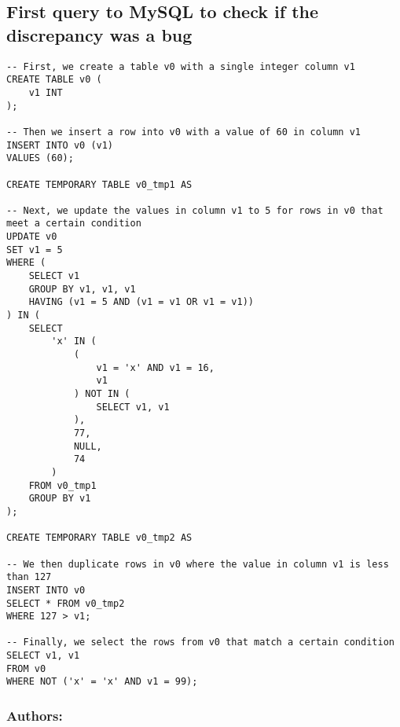 \documentclass[sigconf]{acmart}
\begin{document}
\subsection{First query to MySQL to check if the discrepancy was a bug}
\begin{lstlisting}
-- First, we create a table v0 with a single integer column v1
CREATE TABLE v0 (
    v1 INT
);

-- Then we insert a row into v0 with a value of 60 in column v1
INSERT INTO v0 (v1) 
VALUES (60);

CREATE TEMPORARY TABLE v0_tmp1 AS

-- Next, we update the values in column v1 to 5 for rows in v0 that meet a certain condition
UPDATE v0 
SET v1 = 5 
WHERE (
    SELECT v1 
    GROUP BY v1, v1, v1 
    HAVING (v1 = 5 AND (v1 = v1 OR v1 = v1))
) IN (
    SELECT 
        'x' IN (
            (
                v1 = 'x' AND v1 = 16, 
                v1
            ) NOT IN (
                SELECT v1, v1
            ), 
            77, 
            NULL, 
            74
        ) 
    FROM v0_tmp1 
    GROUP BY v1
);

CREATE TEMPORARY TABLE v0_tmp2 AS

-- We then duplicate rows in v0 where the value in column v1 is less than 127
INSERT INTO v0 
SELECT * FROM v0_tmp2 
WHERE 127 > v1;

-- Finally, we select the rows from v0 that match a certain condition
SELECT v1, v1 
FROM v0 
WHERE NOT ('x' = 'x' AND v1 = 99);
\end{lstlisting}
\subsubsection{Authors:}
\end{document}
